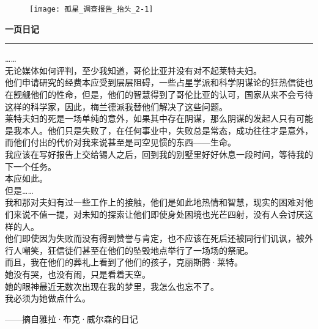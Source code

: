 \documentclass[openany]{book}
\begin{document}
\begin{figure}[h]
    \centering
    \texttt{[image: 孤星\_调查报告\_抬头\_2-1]}
\end{figure}
{\Large\textbf{一页日记}}\par\noindent\rule{\textwidth}{0.4pt}
{
    ……\\
    无论媒体如何评判，至少我知道，哥伦比亚并没有对不起莱特夫妇。\\
    他们申请研究的经费本应受到层层阻碍，一些占星学派和科学阴谋论的狂热信徒也在觊觎他们的性命，但是，他们的智慧得到了哥伦比亚的认可，国家从来不会亏待这样的科学家，因此，梅兰德派我替他们解决了这些问题。\\
    莱特夫妇的死是一场单纯的意外，如果其中存在阴谋，那么阴谋的发起人只有可能是我本人。他们只是失败了，在任何事业中，失败总是常态，成功往往才是意外，而他们付出的代价对我来说甚至是司空见惯的东西——生命。\\
    我应该在写好报告上交给锡人之后，回到我的别墅里好好休息一段时间，等待我的下一个任务。\\
    本应如此。\\
    但是……\\
    我和那对夫妇有过一些工作上的接触，他们是如此地热情和智慧，现实的困难对他们来说不值一提，对未知的探索让他们即使身处困境也光芒四射，没有人会讨厌这样的人。\\
    他们即使因为失败而没有得到赞誉与肯定，也不应该在死后还被同行们讥讽，被外行人嘲笑，狂信徒们甚至在他们的坠毁地点举行了一场场的祭祀。\\
    而且，我在他们的葬礼上看到了他们的孩子，克丽斯腾·莱特。\\
    她没有哭，也没有闹，只是看着天空。\\
    她的眼神最近无数次出现在我的梦里，我怎么也忘不了。\\
    我必须为她做点什么。\\
}
\begin{flushright}——摘自雅拉·布克·威尔森的日记\end{flushright}
\clearpage
\end{document}
